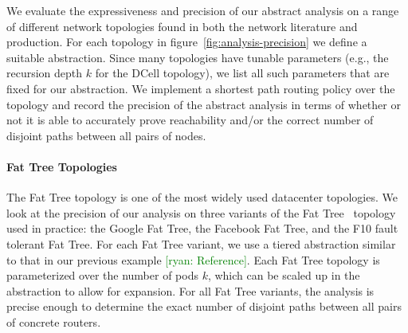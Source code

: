 \documentclass{sig-alternate-10pt}
\newcommand{\cmark}{\ding{51}}
\newcommand{\xmark}{\ding{55}}
\newcommand{\ryan}[1]{\textcolor{green}{[ryan: #1]}}
\newcommand{\para}[1]{\paragraph*{\textbf{#1}}}
\begin{document}

We evaluate the expressiveness and precision of our abstract analysis on a range of different network topologies found in both the network literature and production. For each topology in figure~\ref{fig:analysis-precision} we define a suitable abstraction. Since many topologies have tunable parameters (e.g., the recursion depth $k$ for the DCell topology), we list all such parameters that are fixed for our abstraction. We implement a shortest path routing policy over the topology and record the precision of the abstract analysis in terms of whether or not it is able to accurately prove reachability and/or the correct number of disjoint paths between all pairs of nodes.

\para{Fat Tree Topologies}

The Fat Tree topology is one of the most widely used datacenter topologies. We look at the precision of our analysis on three variants of the Fat Tree~\cite{foo} topology used in practice: the Google Fat Tree, the Facebook Fat Tree, and the F10 fault tolerant Fat Tree. For each Fat Tree variant, we use a tiered abstraction similar to that in our previous example \ryan{Reference}. Each Fat Tree topology is parameterized over the number of pods $k$, which can be scaled up in the abstraction to allow for expansion. For all Fat Tree variants, the analysis is precise enough to determine the exact number of disjoint paths between all pairs of concrete routers.
\end{document}

